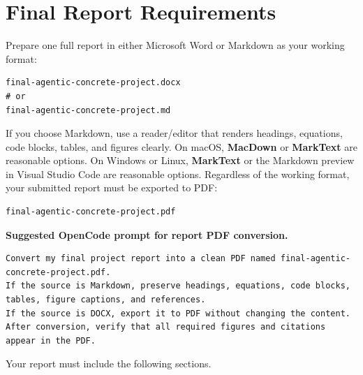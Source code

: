 \documentclass[12pt]{article}
\begin{document}
\section{Final Report Requirements}

Prepare one full report in either Microsoft Word or Markdown as your working format:

\begin{lstlisting}[style=term]
final-agentic-concrete-project.docx
# or
final-agentic-concrete-project.md
\end{lstlisting}

If you choose Markdown, use a reader/editor that renders headings, equations, code blocks, tables, and figures clearly.  On macOS, \textbf{MacDown} or \textbf{MarkText} are reasonable options.  On Windows or Linux, \textbf{MarkText} or the Markdown preview in Visual Studio Code are reasonable options.  Regardless of the working format, your submitted report must be exported to PDF:

\begin{lstlisting}[style=term]
final-agentic-concrete-project.pdf
\end{lstlisting}

\begin{ex-box}
\textbf{Suggested OpenCode prompt for report PDF conversion.}
\begin{lstlisting}[style=term]
Convert my final project report into a clean PDF named final-agentic-concrete-project.pdf.
If the source is Markdown, preserve headings, equations, code blocks, tables, figure captions, and references.
If the source is DOCX, export it to PDF without changing the content.
After conversion, verify that all required figures and citations appear in the PDF.
\end{lstlisting}
\end{ex-box}

Your report must include the following sections.
\end{document}
